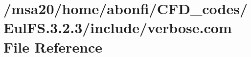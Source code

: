 \hypertarget{msa20_2home_2abonfi_2_c_f_d__codes_2_eul_f_s_83_82_83_2include_2verbose_8com}{\section{/msa20/home/abonfi/\-C\-F\-D\-\_\-codes/\-Eul\-F\-S.3.2.3/include/verbose.com File Reference}
\label{msa20_2home_2abonfi_2_c_f_d__codes_2_eul_f_s_83_82_83_2include_2verbose_8com}
}
